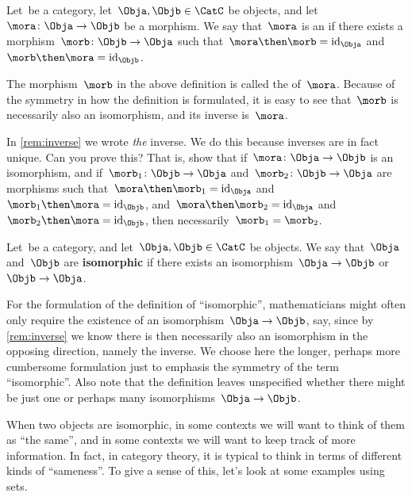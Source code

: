 \begin{ctdefinition}[Isomorphism]
  Let~\CatC be a category, let~$\Obja,\Objb \in \CatC$ be objects, and let~$\mora \colon \Obja \to \Objb$ be a morphism. We say that~$\mora$ is an \emph{} if there exists a morphism~$\morb\colon \Objb \to \Obja$ such that~$\mora \then \morb = \text{id}_\Obja$ and~$\morb \then \mora = \text{id}_\Objb$.
\end{ctdefinition}

\begin{remark}
  \label{rem:inverse}
  The morphism~$\morb$ in the above definition is called the \textbf{} of~$\mora$. Because of the symmetry in how the definition is formulated, it is easy to see that~$\morb$ is necessarily also an isomorphism, and its inverse is~$\mora$.
\end{remark}

\begin{exercise}
  In \cref{rem:inverse} we wrote \emph{the} inverse. We do this because inverses are in fact unique. Can you prove this?
  That is, show that if~$\mora \colon \Obja \to \Objb$ is an isomorphism, and if~$\morb_1\colon \Objb \to \Obja$ and~$\morb_2\colon \Objb \to \Obja$ are morphisms such that~$\mora \then \morb_1 = \text{id}_\Obja$ and~$\morb_1 \then \mora = \text{id}_\Objb$, and~$\mora \then \morb_2 = \text{id}_\Obja$ and~$\morb_2 \then \mora = \text{id}_\Objb$, then necessarily~$\morb_1 = \morb_2$.
\end{exercise}

\begin{ctdefinition}[Isomorphic]
  Let~\CatC be a category, and let~$\Obja,\Objb \in \CatC$ be objects. We say that~$\Obja$ and~$\Objb$ are \textbf{isomorphic} if there exists an isomorphism~$\Obja \to \Objb$ or~$\Objb \to \Obja$.
\end{ctdefinition}

For the formulation of the definition of ``isomorphic'', mathematicians might often only require the existence of an isomorphism~$\Obja \to \Objb$, say, since by \cref{rem:inverse} we know there is then necessarily also an isomorphism in the opposing direction, namely the inverse. We choose here the longer, perhaps more cumbersome formulation just to emphasis the symmetry of the term ``isomorphic''. Also note that the definition leaves unspecified whether there might be just one or perhaps many isomorphisms~$\Obja \to \Objb$.

When two objects are isomorphic, in some contexts we will want to think of them as ``the same'', and in some contexts we will want to keep track of more information. In fact, in category theory, it is typical to think in terms of different kinds of ``sameness''. To give a sense of this, let's look at some examples using sets.

